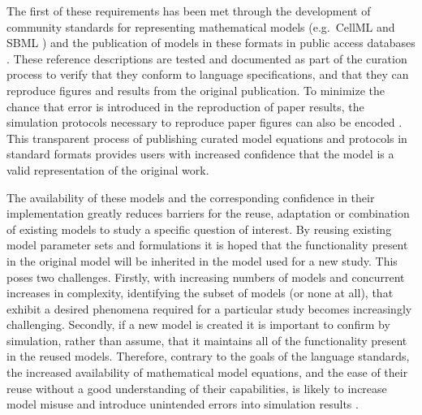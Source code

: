 \documentclass[preprint,authoryear,12pt]{elsarticle}
\begin{document}
The first of these requirements has been met through the development of community standards for representing mathematical models (e.g.\ CellML \citep{Lloyd*.04:CellML} and SBML \citep{SBML.04:Evolving}) and the publication of models in these formats in public access databases \citep{Lloyd*.08:CellML,BioModels.2010}.
These reference descriptions are tested and documented as part of the curation process to verify that they conform to language specifications, and that they can reproduce figures and results from the original publication.
To minimize the chance that error is introduced in the reproduction of paper results, the simulation protocols necessary to reproduce paper figures can also be encoded \citep[e.g.][]{Nickerson&Buist.09:physiome}. %
This transparent process of publishing curated model equations and protocols in standard formats provides users with increased confidence that the model is a valid representation of the original work.


The availability of these models and the corresponding confidence in their implementation greatly reduces barriers for the reuse, adaptation or combination of existing models to study a specific question of interest.
By reusing existing model parameter sets and formulations it is hoped that the functionality present in the original model will be inherited in the model used for a new study.
This poses two challenges.
Firstly, with increasing numbers of models and concurrent increases in complexity, identifying the subset of models (or none at all), that exhibit a desired phenomena required for a particular study becomes increasingly challenging.
Secondly, if a new model is created it is important to confirm by simulation, rather than assume, that it maintains all of the functionality present in the reused models.
Therefore, contrary to the goals of the language standards, the increased availability of mathematical model equations, and the ease of their reuse without a good understanding of their capabilities, is likely to increase model misuse and introduce unintended errors into simulation results \citep{Smith*.07:Computational}.
\end{document}
